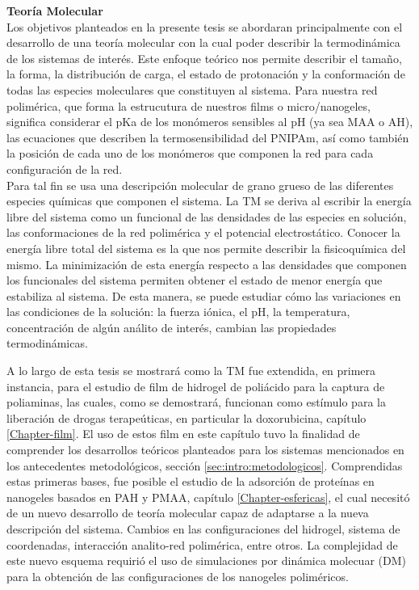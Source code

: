 \textbf{Teor\'ia Molecular}\\
Los objetivos planteados en la presente tesis se abordaran principalmente con el desarrollo de una teor\'ia molecular con la cual poder describir la termodin\'amica de los sistemas de inter\'es.
Este enfoque te\'orico nos permite describir el tama\~no, la forma, la distribuci\'on de carga, el estado de protonaci\'on y la conformaci\'on de todas las especies moleculares que constituyen al sistema. Para nuestra red polim\'erica, que forma la estrucutura de nuestros films o micro/nanogeles, significa considerar el pKa de los mon\'omeros sensibles al pH (ya sea MAA o AH), las ecuaciones que describen la termosensibilidad del PNIPAm, as\'i como tambi\'en la posici\'on de cada uno de los mon\'omeros que componen la red para cada configuraci\'on de la red.\\
Para tal fin se usa una descripci\'on molecular de grano grueso de las diferentes especies qu\'imicas que componen el sistema. 
La TM se deriva al escribir la energía libre del sistema como un funcional de las densidades de las especies en soluci\'on, las conformaciones de la red polim\'erica y el potencial electrost\'atico.
Conocer la energ\'ia libre total del sistema es la que nos permite describir la fisicoqu\'imica del mismo. La minimizaci\'on de esta energ\'ia respecto a las densidades que componen los funcionales del sistema permiten obtener el estado de menor energ\'ia que estabiliza al sistema.
De esta manera, se puede estudiar c\'omo las variaciones en las condiciones de la soluci\'on: la fuerza i\'onica, el pH, la temperatura, concentraci\'on de alg\'un an\'alito de inter\'es, cambian las propiedades termodin\'amicas.

A lo largo de esta tesis se mostrar\'a como la TM fue extendida, en primera instancia, para el estudio de film de hidrogel  de poli\'acido para la captura de poliaminas, las cuales, como se demostrar\'a, funcionan como est\'imulo para la liberaci\'on de drogas terape\'uticas, en particular la doxorubicina, cap\'itulo \ref{Chapter-film}.
El uso de estos film en este cap\'itulo tuvo la finalidad de comprender los desarrollos te\'oricos planteados para los sistemas mencionados en los antecedentes metodol\'ogicos, secci\'on \ref{sec:intro:metodologicos}.
Comprendidas estas primeras bases, fue posible el estudio de la adsorci\'on de prote\'inas en nanogeles basados en PAH y PMAA, cap\'itulo \ref{Chapter-esfericas},  el cual necesit\'o de un nuevo desarrollo de teor\'ia molecular capaz de adaptarse a la nueva descripci\'on del sistema.  Cambios en las configuraciones del hidrogel, sistema de coordenadas, interacci\'on analito-red polim\'erica, entre otros.
La complejidad de este nuevo esquema requiri\'o el uso de simulaciones por din\'amica molecuar (DM)  para la obtenci\'on de las configuraciones de los nanogeles  polim\'ericos.


